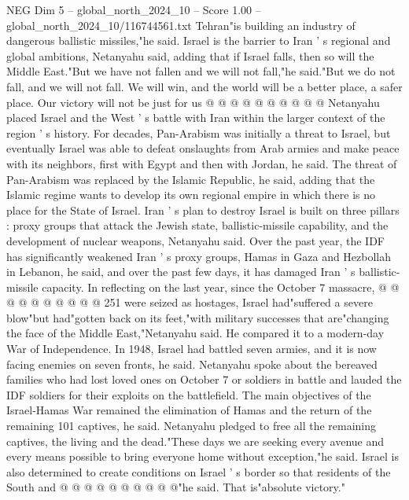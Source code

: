 \begin{textsample}{NEG Dim 5 – global\_north\_2024\_10 – Score 1.00 – global\_north\_2024\_10/116744561.txt}
Tehran"is building an industry of dangerous ballistic missiles,"he said.
Israel is the barrier to Iran ' s regional and global ambitions, Netanyahu said, adding that if Israel falls, then so will the Middle East."But we have not fallen and we will not fall,"he said."But we do not fall, and we will not fall.
We will win, and the world will be a better place, a safer place.
Our victory will not be just for us @ @ @ @ @ @ @ @ @ @ Netanyahu placed Israel and the West ' s battle with Iran within the larger context of the region ' s history.
For decades, Pan-Arabism was initially a threat to Israel, but eventually Israel was able to defeat onslaughts from Arab armies and make peace with its neighbors, first with Egypt and then with Jordan, he said.
The threat of Pan-Arabism was replaced by the Islamic Republic, he said, adding that the Islamic regime wants to develop its own regional empire in which there is no place for the State of Israel.
Iran ' s plan to destroy Israel is built on three pillars : proxy groups that attack the Jewish state, ballistic-missile capability, and the development of nuclear weapons, Netanyahu said.
Over the past year, the IDF has significantly weakened Iran ' s proxy groups, Hamas in Gaza and Hezbollah in Lebanon, he said, and over the past few days, it has damaged Iran ' s ballistic-missile capacity.
In reflecting on the last year, since the October 7 massacre, @ @ @ @ @ @ @ @ @ @ 251 were seized as hostages, Israel had"suffered a severe blow"but had"gotten back on its feet,"with military successes that are"changing the face of the Middle East,"Netanyahu said.
He compared it to a modern-day War of Independence.
In 1948, Israel had battled seven armies, and it is now facing enemies on seven fronts, he said.
Netanyahu spoke about the bereaved families who had lost loved ones on October 7 or soldiers in battle and lauded the IDF soldiers for their exploits on the battlefield.
The main objectives of the Israel-Hamas War remained the elimination of Hamas and the return of the remaining 101 captives, he said.
Netanyahu pledged to free all the remaining captives, the living and the dead."These days we are seeking every avenue and every means possible to bring everyone home without exception,"he said.
Israel is also determined to create conditions on Israel ' s border so that residents of the South and @ @ @ @ @ @ @ @ @ @"he said.
That is"absolute victory."

\end{textsample}
